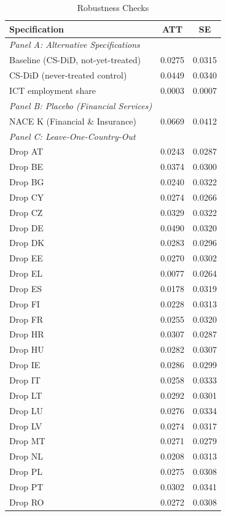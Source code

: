 \begin{table}[htbp]
\centering
\caption{Robustness Checks}
\label{tab:robustness}
\begin{tabular}{lcc}
\toprule
Specification & ATT & SE \\
\midrule
\textit{Panel A: Alternative Specifications} & & \\[0.3em]
Baseline (CS-DiD, not-yet-treated) &  0.0275  &  0.0315  \\
 CS-DiD (never-treated control) & 0.0449 & 0.0340 \\
 ICT employment share &  0.0003  &  0.0007  \\[0.5em]
\textit{Panel B: Placebo (Financial Services)} & & \\[0.3em]
NACE K (Financial \& Insurance) &  0.0669  &  0.0412  \\[0.5em]
\textit{Panel C: Leave-One-Country-Out} & & \\[0.3em]
Drop AT & 0.0243 & 0.0287 \\
Drop BE & 0.0374 & 0.0300 \\
Drop BG & 0.0240 & 0.0322 \\
Drop CY & 0.0274 & 0.0266 \\
Drop CZ & 0.0329 & 0.0322 \\
Drop DE & 0.0490 & 0.0320 \\
Drop DK & 0.0283 & 0.0296 \\
Drop EE & 0.0270 & 0.0302 \\
Drop EL & 0.0077 & 0.0264 \\
Drop ES & 0.0178 & 0.0319 \\
Drop FI & 0.0228 & 0.0313 \\
Drop FR & 0.0255 & 0.0320 \\
Drop HR & 0.0307 & 0.0287 \\
Drop HU & 0.0282 & 0.0307 \\
Drop IE & 0.0286 & 0.0299 \\
Drop IT & 0.0258 & 0.0333 \\
Drop LT & 0.0292 & 0.0301 \\
Drop LU & 0.0276 & 0.0334 \\
Drop LV & 0.0274 & 0.0317 \\
Drop MT & 0.0271 & 0.0279 \\
Drop NL & 0.0208 & 0.0313 \\
Drop PL & 0.0275 & 0.0308 \\
Drop PT & 0.0302 & 0.0341 \\
Drop RO & 0.0272 & 0.0308 \\

\end{tabular}
\end{table}
